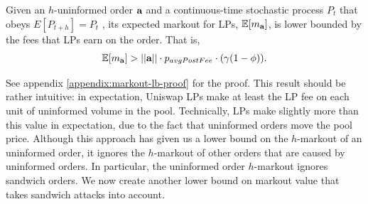 

    \newpage
    \begin{theorem}
        Given an $h$-uninformed order $\textbf a$ and a continuous-time stochastic process $P_{t}$
        that obeys $E[P_{t+h}] = P_t$
        , its expected markout for LPs, $\mathbb E[m_{\textbf a}]$, is lower bounded by the fees that LPs earn on the order. That is,
            $$\mathbb E[m_{\textbf a}] > || \textbf a || \cdot p_{avgPostFee} \cdot (\gamma(1-\phi)).$$
        
    \end{theorem}

    See appendix \ref{appendix:markout-lb-proof} for the proof. This result should be rather intuitive: in expectation, Uniswap LPs make at least the LP fee on each unit of uninformed volume in the pool. Technically, LPs make slightly more than this value in expectation, due to the fact that uninformed orders move the pool price. Although this approach has given us a lower bound on the $h$-markout of an uninformed order, it ignores the $h$-markout of other orders that are caused by uninformed orders. In particular, the uninformed order $h$-markout ignores sandwich orders. We now create another lower bound on markout value that takes sandwich attacks into account.
        
